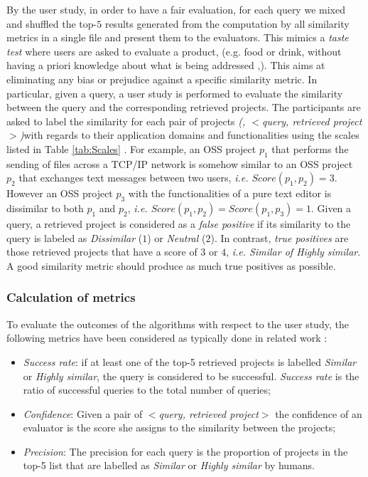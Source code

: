By the user study, in order to have a fair evaluation, for each query we mixed and shuffled the top-$5$ results generated from the computation by all similarity metrics in a single file and present them to the evaluators. This mimics a \emph{taste test} where users are asked to evaluate a product, (e.g. food or drink, without having a priori knowledge about what is being addressed \cite{Ghose2001},\cite{doi:10.1108/13522750810879048}). This aims at eliminating any bias or prejudice against a specific similarity metric. In particular, given a query, a user study is performed to evaluate the similarity between the query and the corresponding retrieved projects. The participants are asked to label the similarity for each pair of projects \emph{(, $<$\textit{query, retrieved project}$>$)}with regards to their application domains and functionalities using the scales listed in Table \ref{tab:Scales} \cite{McMillan:2012:DSS:2337223.2337267}. For example, an OSS project $p_{1}$ that performs the sending of files across a TCP/IP network is somehow similar to an OSS project $p_{2}$ that exchanges text messages between two users, \emph{i.e. $Score(p_{1},p_{2})=3$}. However an OSS project $p_{3}$ with the functionalities of a pure text editor is dissimilar to both $p_{1}$ and $p_{2}$, \emph{i.e. $Score(p_{1},p_{2})=Score(p_{1},p_{3})=1$}. Given a query, a retrieved project is considered as a \emph{false positive} if its similarity to the query is labeled as \emph{Dissimilar} ($1$) or \emph{Neutral} ($2$). In contrast, \emph{true positives} are those retrieved projects that have a score of $3$ or $4$, \emph{i.e. \emph{Similar} of \emph{Highly similar}}. A good similarity metric should produce as much true positives as possible.







\subsubsection{Calculation of metrics}

To evaluate the outcomes of the algorithms with respect to the user study, the following metrics have been considered as typically done in related work \cite{Lo:2012:DSA:2473496.2473616,McMillan:2012:DSS:2337223.2337267,10.1109/SANER.2017.7884605}:

\begin{itemize}
	\item \textit{Success rate}: if at least one of the top-5 retrieved projects is labelled \emph{Similar} or \emph{Highly similar}, the query is considered to be successful. {\em Success rate} is the ratio of successful queries to the total number of queries;
	\item \textit{Confidence}: Given a pair of $<$\textit{query, retrieved project}$>$ the confidence of an evaluator is the score she assigns to the similarity between the projects;
	\item \textit{Precision}: The precision for each query is the proportion of projects in the top-5 list that are labelled as \emph{Similar} or \emph{Highly similar} by humans. 
\end{itemize}

